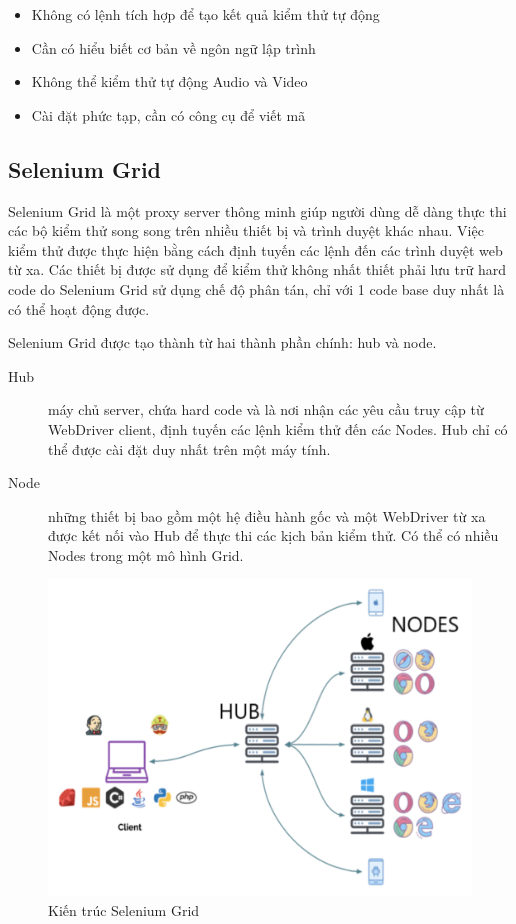 \documentclass[./../main_file.tex]{subfiles}
\begin{document}
	\begin{itemize}
		\item Không có lệnh tích hợp để tạo kết quả kiểm thử tự động
		\item Cần có hiểu biết cơ bản về ngôn ngữ lập trình
		\item Không thể kiểm thử tự động Audio và Video
		\item Cài đặt phức tạp, cần có công cụ để viết mã
	\end{itemize}
	
	\subsection{Selenium Grid}
	
	Selenium Grid là một proxy server thông minh giúp người dùng dễ dàng thực thi các bộ kiểm thử song song trên nhiều thiết bị và trình duyệt khác nhau. Việc kiểm thử được thực hiện bằng cách định tuyến các lệnh đến các trình duyệt web từ xa. Các thiết bị được sử dụng để kiểm thử không nhất thiết phải lưu trữ hard code do Selenium Grid sử dụng chế độ phân tán, chỉ với 1 code base duy nhất là có thể hoạt động được.
	
	Selenium Grid được tạo thành từ hai thành phần chính: hub và node.
	
	\begin{description}
		\item[Hub] máy chủ server, chứa hard code và là nơi nhận các yêu cầu truy cập từ WebDriver client, định tuyến các lệnh kiểm thử đến các Nodes. Hub chỉ có thể được cài đặt duy nhất trên một máy tính.
		\item[Node] những thiết bị bao gồm một hệ điều hành gốc và một WebDriver từ xa được kết nối vào Hub để thực thi các kịch bản kiểm thử. Có thể có nhiều Nodes trong một mô hình Grid.
	\end{description}

	\begin{figure}[H]
		\centering
		\includegraphics[width=0.8\linewidth]{./images/image3.png}
		\caption{Kiến trúc Selenium Grid}
	\end{figure}
\end{document}
